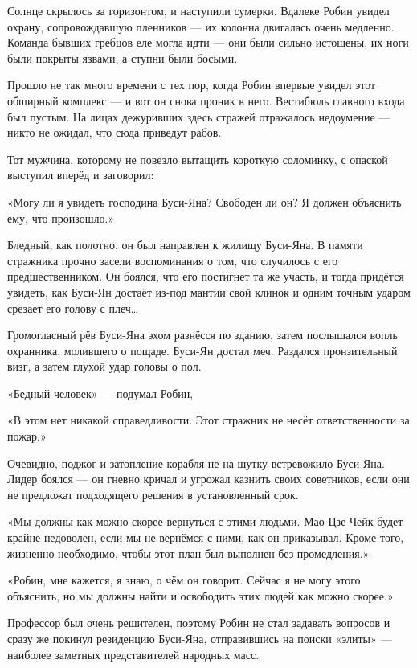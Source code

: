 \documentclass[a5paper, 9pt,
final, openany, twoside=true]{memoir}
\begin{document}
Солнце скрылось за горизонтом, и наступили сумерки. Вдалеке Робин увидел охрану, сопровождавшую пленников — их колонна двигалась очень медленно. Команда бывших гребцов еле могла идти — они были сильно истощены, их ноги были покрыты язвами, а ступни были босыми.\bigskip

Прошло не так много времени с тех пор, когда Робин впервые увидел этот обширный комплекс — и вот он снова проник в него. Вестибюль главного входа был пустым. На лицах дежуривших здесь стражей отражалось недоумение — никто не ожидал, что сюда приведут рабов.

Тот мужчина, которому не повезло вытащить короткую соломинку, с опаской выступил вперёд и заговорил:

«Могу ли я увидеть господина Буси-Яна? Свободен ли он? Я должен объяснить ему, что произошло.»

Бледный, как полотно, он был направлен к жилищу Буси-Яна. В памяти стражника прочно засели воспоминания о том, что случилось с его предшественником. Он боялся, что его постигнет та же участь, и тогда придётся увидеть, как Буси-Ян достаёт из-под мантии свой клинок и одним точным ударом срезает его голову с плеч…\bigskip

Громогласный рёв Буси-Яна эхом разнёсся по зданию, затем послышался вопль охранника, молившего о пощаде. Буси-Ян достал меч. Раздался пронзительный визг, а затем глухой удар головы о пол.\bigskip

«Бедный человек» — подумал Робин,

«В этом нет никакой справедливости. Этот стражник не несёт ответственности за пожар.»\bigskip

Очевидно, поджог и затопление корабля не на шутку встревожило Буси-Яна. Лидер боялся — он гневно кричал и угрожал казнить своих советников, если они не предложат подходящего решения в установленный срок.

«Мы должны как можно скорее вернуться с этими людьми. Мао Цзе-Чейк будет крайне недоволен, если мы не вернёмся с ними, как он приказывал. Кроме того, жизненно необходимо, чтобы этот план был выполнен без промедления.»\bigskip

«Робин, мне кажется, я знаю, о чём он говорит. Сейчас я не могу этого объяснить, но мы должны найти и освободить этих людей как можно скорее.»

Профессор был очень решителен, поэтому Робин не стал задавать вопросов и сразу же покинул резиденцию Буси-Яна, отправившись на поиски «элиты» — наиболее заметных представителей народных масс.
\end{document}
